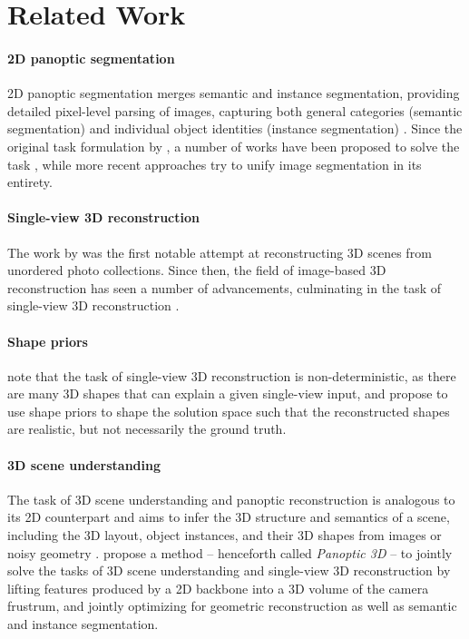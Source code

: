 \section{Related Work}
\label{sec:related}

\paragraph{2D panoptic segmentation}
2D panoptic segmentation merges semantic and instance segmentation, providing detailed pixel-level parsing of images, capturing both general categories (semantic segmentation)
and individual object identities (instance segmentation) \citep{kirillov2019panoptic}. Since the original task formulation by \citet{kirillov2019panoptic}, a number of works
have been proposed to solve the task \cite{wang2020axial, cheng2020panoptic, mohan2021efficientps, Li_2021_CVPR, Wang_2021_CVPR, Li_2022_CVPR, Kundu_2022_CVPR, Cheng_2022_CVPR, Yu_2022_CVPR, Xu_2023_CVPR, Chen_2023_ICCV, li2023mask, yu2023convolutions},
while more recent approaches \citep{Jain_2023_CVPR} try to unify image segmentation in its entirety.

\paragraph{Single-view 3D reconstruction}
The work by \citet{snavely2006photo} was the first notable attempt at reconstructing 3D scenes from unordered photo collections. Since then, the field of image-based 3D reconstruction
has seen a number of advancements, culminating in the task of single-view 3D reconstruction \citep{choy20163d, wang2018pixel2mesh, mescheder2019occupancy, huang2019perspectivenet, shin20193d, denninger20203d, nie2020total3dunderstanding}.

\paragraph{Shape priors}
\citet{wu2018learning} note that the task of single-view 3D reconstruction is non-deterministic, as there are many 3D shapes that can explain a given single-view input, and propose
to use shape priors to shape the solution space such that the reconstructed shapes are realistic, but not necessarily the ground truth.

\paragraph{3D scene understanding}
The task of 3D scene understanding and panoptic reconstruction is analogous to its 2D counterpart and aims to infer the 3D structure and semantics of a scene, including the 3D layout, object instances, and their 3D shapes from images \citep{dahnert2021panoptic} or noisy geometry \citep{hou20193d, hou2020revealnet}.
\citet{dahnert2021panoptic} propose a method -- henceforth called \emph{Panoptic 3D} -- to jointly solve the tasks of 3D scene understanding and single-view 3D reconstruction by lifting features produced by a 2D backbone into a 3D volume of the camera frustrum, and jointly optimizing for geometric reconstruction as well as semantic and instance segmentation. 

